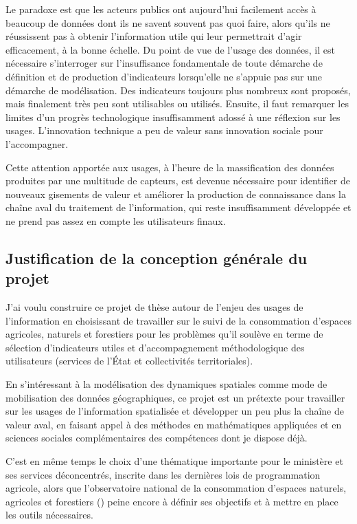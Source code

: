 Le paradoxe est que les acteurs publics ont aujourd'hui facilement accès à
beaucoup de données dont ils ne savent souvent pas quoi faire, alors qu'ils ne
réussissent pas à obtenir l'information utile qui leur permettrait d'agir
efficacement, à la bonne échelle.
Du point de vue de l'usage des données,
il est nécessaire s'interroger sur l'insuffisance fondamentale
de toute démarche de définition et de production
d'indicateurs lorsqu'elle ne s'appuie pas sur une démarche
de modélisation. Des indicateurs toujours plus nombreux
sont proposés, mais finalement très peu sont utilisables ou utilisés.
Ensuite, il faut remarquer les limites d'un progrès
technologique insuffisamment adossé à une réflexion sur les usages.
L'innovation technique a peu de valeur sans innovation sociale
pour l'accompagner.

Cette attention apportée aux usages, à l'heure de la massification des
données produites par une multitude de capteurs, est devenue nécessaire pour identifier de
nouveaux gisements de valeur et améliorer la production de connaissance
dans la chaîne aval du traitement de l'information, qui reste
insuffisamment développée et ne prend pas assez en compte les utilisateurs
finaux.


\subsection
{Justification de la conception générale du projet}

J'ai voulu construire ce projet de thèse autour de
l'enjeu des usages de l'information en choisissant de
travailler sur le suivi de la consommation d'espaces agricoles,
naturels et forestiers pour les problèmes qu'il soulève en terme
de sélection d'indicateurs utiles et d'accompagnement méthodologique des utilisateurs
(services de l'État et collectivités territoriales).

En s'intéressant à la modélisation des dynamiques spatiales comme mode de
mobilisation des données géographiques, ce projet est un prétexte pour
travailler sur les usages de l'information spatialisée et développer un peu
plus la chaîne de valeur aval, en faisant appel à des méthodes en
mathématiques appliquées et en sciences sociales complémentaires des
compétences dont je dispose déjà.

C'est en même temps le choix d'une thématique importante pour le ministère et
ses services déconcentrés, inscrite dans les dernières lois de programmation
agricole, alors que l'observatoire national de la consommation d'espaces
naturels, agricoles et forestiers ({\OENAF}) peine encore à définir ses
objectifs et à mettre en place les outils nécessaires.